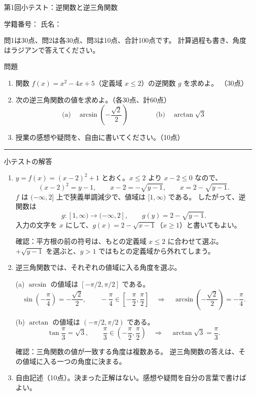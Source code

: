 \documentclass[a4paper,10pt,dvipdfmx]{jsarticle}
\renewcommand{\handout}[2]{%
  \def\handoutnumber{第#1回}%
  \begin{center}
    {\Large\normalfont\mdseries\color{ink}第#1回\quad #2}\par
    \vspace{2pt}{\color{accent}\rule{0.88\linewidth}{1.2pt}}
  \end{center}\vspace{2pt}}
\renewcommand{\topic}[1]{\par\vspace{5pt}%
  {\large\normalfont\mdseries\color{accent}#1}\par\vspace{1pt}}
\renewcommand{\keybox}[1]{\par\smallskip\begingroup
  \setlength{\fboxsep}{4pt}%
  \colorbox{pale}{\parbox{\dimexpr\linewidth-2\fboxsep\relax}{\small #1}}%
  \endgroup\par\smallskip}
\begin{document}
\pagestyle{empty}
\handout{1}{小テスト：逆関数と逆三角関数}

学籍番号：\underline{\hspace{40mm}}\hfill
氏名：\underline{\hspace{40mm}}

問1は30点、問2は各30点、問3は10点、合計100点です。
計算過程も書き、角度はラジアンで答えてください。

\topic{問題}
\begin{enumerate}[label=\color{accent}\arabic*.,leftmargin=2.4em,itemsep=9pt]
\item 関数 $f(x)=x^2-4x+5$（定義域 $x\leq2$）の逆関数 $g$ を求めよ。
\hfill（30点）
\par\vspace{3mm}

\item 次の逆三角関数の値を求めよ。\hfill（各30点、計60点）
$$
 \text{(a)}\quad\arcsin\!\left(-\frac{\sqrt2}{2}\right)
 \qquad\qquad
 \text{(b)}\quad\arctan\sqrt3
$$
\par\vspace{3mm}

\item 授業の感想や疑問を、自由に書いてください。\hfill（10点）
\end{enumerate}

\par\vspace{4mm}
{\color{accent}\rule{\linewidth}{0.6pt}}
\topic{小テストの解答}
\begin{enumerate}[label=\color{accent}\arabic*.,leftmargin=2.4em,itemsep=9pt]
\item $y=f(x)=(x-2)^2+1$ とおく。$x\leq2$ より $x-2\leq0$ なので、
$$
 (x-2)^2=y-1,\qquad x-2=-\sqrt{y-1},\qquad x=2-\sqrt{y-1}.
$$
$f$ は $(-\infty,2]$ 上で狭義単調減少で、値域は $[1,\infty)$ である。
したがって、逆関数は
$$
 g\colon[1,\infty)\longrightarrow(-\infty,2],\qquad
 g(y)=2-\sqrt{y-1}.
$$
入力の文字を $x$ にして、$g(x)=2-\sqrt{x-1}$（$x\ge1$）と書いてもよい。

\keybox{確認：平方根の前の符号は、もとの定義域 $x\leq2$ に合わせて選ぶ。
$+\sqrt{y-1}$ を選ぶと、$y>1$ ではもとの定義域から外れてしまう。}

\item 逆三角関数では、それぞれの値域に入る角度を選ぶ。

(a) $\arcsin$ の値域は $[-\pi/2,\pi/2]$ である。
$$
 \sin\!\left(-\frac\pi4\right)=-\frac{\sqrt2}{2},\qquad
 -\frac\pi4\in\left[-\frac\pi2,\frac\pi2\right]
 \quad\Longrightarrow\quad
 \arcsin\!\left(-\frac{\sqrt2}{2}\right)=-\frac\pi4.
$$

\medskip
(b) $\arctan$ の値域は $(-\pi/2,\pi/2)$ である。
$$
 \tan\frac\pi3=\sqrt3,\qquad
 \frac\pi3\in\left(-\frac\pi2,\frac\pi2\right)
 \quad\Longrightarrow\quad
 \arctan\sqrt3=\frac\pi3.
$$

\keybox{確認：三角関数の値が一致する角度は複数ある。
逆三角関数の答えは、その値域に入る一つの角度に決まる。}

\item 自由記述（10点）。決まった正解はない。感想や疑問を自分の言葉で書けばよい。
\end{enumerate}
\end{document}
